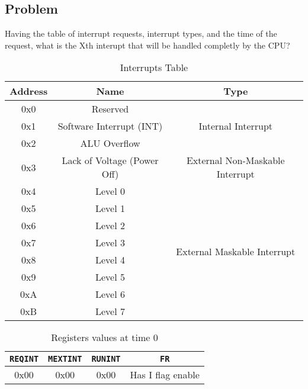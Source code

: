 \subsection*{Problem}
Having the table of interrupt requests, interrupt types, and the time of the request, what is
the Xth interupt that will be handled completly by the CPU?

\begin{table}[H]
    \centering
        \begin{tabular}{|c|c|c|}
            \hline
            \textbf{Address} & \textbf{Name} & \textbf{Type} \\ \hline
            0x0 & Reserved  & \multirow{3}{*}{Internal Interrupt} \\ \cline{1-2}
            0x1 & Software Interrupt (INT) & \\ \cline{1-2}
            0x2 & ALU Overflow & \\ \hline
            0x3 & Lack of Voltage (Power Off) & External Non-Maskable Interrupt \\ \hline
            0x4 & Level 0 & \multirow{8}{*}{External Maskable Interrupt} \\ \cline{1-2}
            0x5 & Level 1 & \\ \cline{1-2}
            0x6 & Level 2 & \\ \cline{1-2}
            0x7 & Level 3 & \\ \cline{1-2}
            0x8 & Level 4 & \\ \cline{1-2}
            0x9 & Level 5 & \\ \cline{1-2}
            0xA & Level 6 & \\ \cline{1-2}
            0xB & Level 7 & \\ \hline
        \end{tabular}
        \caption{Interrupts Table}
\end{table}

\begin{table}[H]
    \centering
    \begin{tabular}{|c|c|c|c|}
        \hline
        \texttt{REQINT} & \texttt{MEXTINT} & \texttt{RUNINT} & \texttt{FR} \\ \hline
        0x00 & 0x00 & 0x00 & Has I flag enable \\ \hline
    \end{tabular}
    \caption{Registers values at time 0}
\end{table}

